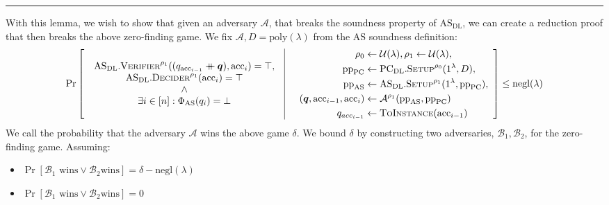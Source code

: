 \documentclass[
]{article}
\providecommand{\tightlist}{%
  \setlength{\itemsep}{0pt}\setlength{\parskip}{0pt}}
\newcommand*\Ac{\mathcal{A}}
\newcommand*\Bc{\mathcal{B}}
\newcommand*\Uc{\mathcal{U}}
\renewcommand*\d{\delta}
\renewcommand*\l{\lambda}
\newcommand*\cat{\mathbin{+\mkern-10mu+}}
\renewcommand{\vec}[1]{ \boldsymbol{#1} }
\newcommand*{\negl}{\text{negl}}
\newcommand*{\poly}{\text{poly}}
\newcommand*{\pp}{\mathrm{pp}}
\newcommand*{\acc}{\mathrm{acc}}
\newcommand*{\ToInstance}{\mathrm{\text{T\scriptsize O}\text{I\scriptsize NSTANCE}}}
\newcommand*{\Setup}{\mathrm{\text{S{\scriptsize ETUP}}}}
\newcommand*{\AS}{\text{AS}}
\newcommand*{\PC}{\text{PC}}
\newcommand*{\PCDL}{\text{PC}_{\text{DL}}}
\newcommand*{\PCDLSetup}{\PCDL.\Setup}
\newcommand*{\ASDL}{\text{AS}_{\text{DL}}}
\newcommand*{\ASDLSetup}{\ASDL.\Setup}
\newcommand*{\ASDLVerifier}{\ASDL.\mathrm{\text{V\scriptsize ERIFIER}}}
\newcommand*{\ASDLDecider}{\ASDL.\mathrm{\text{D\scriptsize ECIDER}}}
\begin{document}
\begin{center}\rule{0.5\linewidth}{0.5pt}\end{center}

With this lemma, we wish to show that given an adversary \(\Ac\), that
breaks the soundness property of \(\ASDL\), we can create a reduction
proof that then breaks the above zero-finding game. We fix
\(\Ac, D = \poly(\l)\) from the \(\AS\) soundness definition: \[
\Pr \left[
  \begin{array}{c|c}
    \begin{array}{c}
      \ASDLVerifier^{\rho_1}((q_{\acc_{i-1}} \cat \vec{q}), \acc_i) = \top, \\
      \ASDLDecider^{\rho_1}(\acc_i) = \top \\
      \land \\
      \exists i \in [n] : \Phi_\AS(q_i) = \bot
    \end{array}
  & \quad
    \begin{aligned}
      \rho_0 &\leftarrow \Uc(\l), \rho_1 \leftarrow \Uc(\l), \\
      \pp_\PC &\leftarrow \PCDLSetup^{\rho_0}(1^\l, D), \\
      \pp_\AS &\leftarrow \ASDLSetup^{\rho_1}(1^\l, \pp_\PC), \\
      (\vec{q}, \acc_{i-1}, \acc_i) &\leftarrow \Ac^{\rho_1}(\pp_\AS, \pp_\PC) \\
      q_{acc_{i-1}} &\leftarrow \ToInstance(\acc_{i-1}) \\
    \end{aligned}
  \end{array}
\right] \leq \negl(\l)
\] We call the probability that the adversary \(\Ac\) wins the above
game \(\d\). We bound \(\d\) by constructing two adversaries,
\(\Bc_1, \Bc_2\), for the zero-finding game. Assuming:

\begin{itemize}
\tightlist
\item
  \(\Pr[\Bc_1 \text{ wins} \lor \Bc_2 \text{wins}] = \delta - \negl(\l)\)
\item
  \(\Pr[\Bc_1 \text{ wins} \lor \Bc_2 \text{wins}] = 0\)
\end{itemize}
\end{document}
